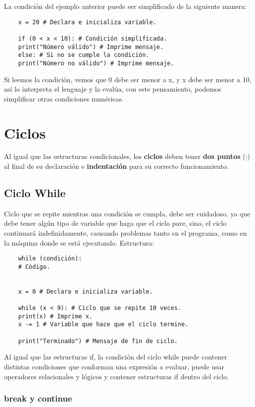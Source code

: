 La condición del ejemplo anterior puede ser simplificado de la siguiente manera:
\begin{lstlisting}
    x = 20 # Declara e inicializa variable.

    if (0 < x < 10): # Condición simplificada.
	print("Número válido") # Imprime mensaje.
    else: # Si no se cumple la condición.
	print("Número no válido") # Imprime mensaje.
\end{lstlisting}

Si leemos la condición, vemos que 0 debe ser menor a x, y x debe ser menor a 10, así lo interpreta el lenguaje y la evalúa, con este pensamiento, podemos simplificar otras condiciones numéricas.



\section{Ciclos}

Al igual que las estructuras condicionales, los \textbf{ciclos} deben tener \textbf{dos puntos} (:) al final de su declaración e \textbf{indentación} para su correcto funcionamiento.


\subsection{Ciclo While}

Ciclo que se repite mientras una condición se cumpla, debe ser cuidadoso, ya que debe tener algún tipo de variable que haga que el ciclo pare, sino, el ciclo continuará indefinidamente, causando problemas tanto en el programa, como en la máquina donde se está ejecutando. Estructura:
\begin{lstlisting}
    while (condición):
	# Código.


    x = 0 # Declara e inicializa variable.

    while (x < 9): # Ciclo que se repite 10 veces.
	print(x) # Imprime x.
	x -= 1 # Variable que hace que el ciclo termine.

    print("Terminado") # Mensaje de fin de ciclo.
\end{lstlisting}

Al igual que las estructuras if, la condición del ciclo while puede contener distintas condiciones que conforman una expresión a evaluar, puede usar operadores relacionales y lógicos y contener estructuras if dentro del ciclo.


\subsubsection{break y continue}

